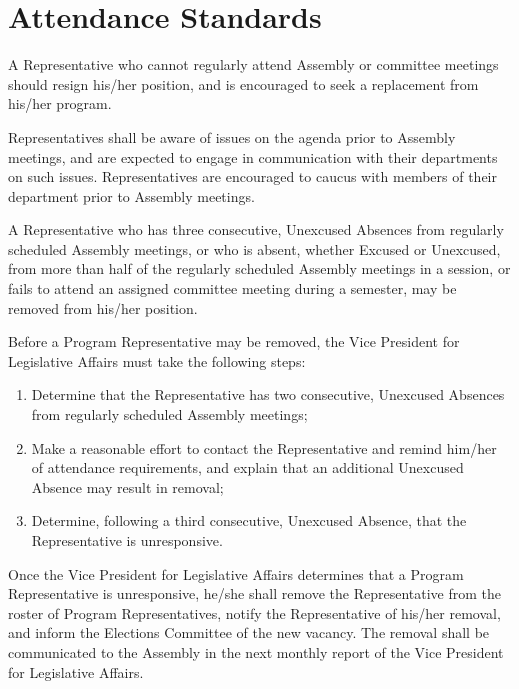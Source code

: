 \section{Attendance Standards}
\begin{bylaws-number}
  \item A Representative who cannot regularly attend Assembly or committee meetings should resign his/her position, and is encouraged to seek a replacement from his/her program.
  \item Representatives shall be aware of issues on the agenda prior to Assembly meetings, and are expected to engage in communication with their departments on such issues. Representatives are encouraged to caucus with members of their department prior to Assembly meetings.
  \item A Representative who has three consecutive, Unexcused Absences from regularly scheduled Assembly meetings, or who is absent, whether Excused or Unexcused, from more than half of the regularly scheduled Assembly meetings in a session, or fails to attend an assigned committee meeting during a semester, may be removed from his/her position.
  \item Before a Program Representative may be removed, the Vice President for Legislative Affairs must take the following steps:
  \begin{enumerate}
    \item Determine that the Representative has two consecutive, Unexcused Absences from regularly scheduled Assembly meetings;
    \item Make a reasonable effort to contact the Representative and remind him/her of attendance requirements, and explain that an additional Unexcused Absence may result in removal;
    \item Determine, following a third consecutive, Unexcused Absence, that the Representative is unresponsive.
  \end{enumerate}
  \item Once the Vice President for Legislative Affairs determines that a Program Representative is unresponsive, he/she shall remove the Representative from the roster of Program Representatives, notify the Representative of his/her removal, and inform the Elections Committee of the new vacancy. The removal shall be communicated to the Assembly in the next monthly report of the Vice President for Legislative Affairs.
\end{bylaws-number}

